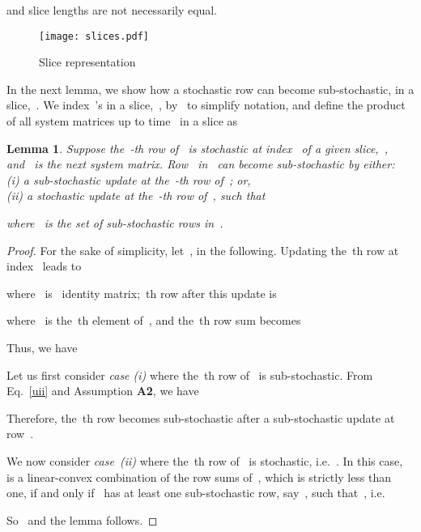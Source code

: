 \documentclass[draftclsnofoot, onecolumn, 12pt]{IEEEtran}
\newtheorem{lem}{Lemma}
\begin{document}
and slice lengths are not necessarily equal. 
\begin{figure}[!h]
\centering
\texttt{[image: slices.pdf]}
\caption{Slice representation}
\label{f0}
\end{figure}

In the next lemma, we show how a stochastic row can become sub-stochastic, in a slice,~. We index~'s in a slice,~, by~ to simplify notation, and define the product of all system matrices up to time~ in a slice as


\begin{lem}\label{lem2}
Suppose the~-th row of~ is stochastic at index~ of a given slice,~, and~ is the next system matrix. Row~ in~ can become sub-stochastic by either:\\
(i) a sub-stochastic update at the~-th row of~; or,\\
(ii) a stochastic update at the~-th row of~, such that 

where~ is the set of sub-stochastic rows in~.
\end{lem} 
\begin{proof}
For the sake of simplicity, let~, in the following. Updating the~th row at index~ leads to

where~ is~ identity matrix;~th row after this update is

where~ is the~th element of~, and the~th row sum becomes

Thus, we have

Let us first consider \textit{case (i)} where the~th row of~ is sub-stochastic. From Eq.~\eqref{uii} and Assumption {\bf A2}, we have

Therefore, the~th row becomes sub-stochastic after a sub-stochastic update at row~. 

We now consider \textit{case~(ii)} where the~th row of~ is stochastic, i.e.~. In this case,~ is a linear-convex combination of the row sums of~, which is strictly less than one, if and only if~ has at least one sub-stochastic row, say~, such that~, i.e.

So~ and the lemma follows.
\end{proof}
\end{document}
